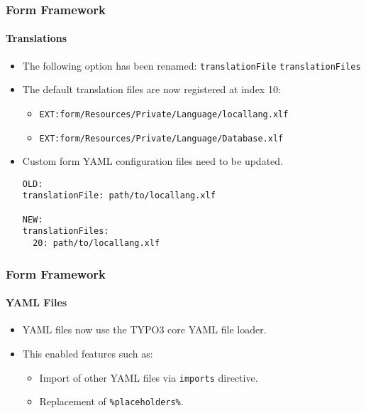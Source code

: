 \begin{frame}[fragile]
	\frametitle{Form Framework}
	\framesubtitle{Translations}

	\lstset{basicstyle=\tiny\ttfamily}

	\begin{itemize}
		\item The following option has been renamed:\newline
			\small\texttt{translationFile} \textrightarrow\hspace{0.1cm}\texttt{translationFiles}\normalsize
		\item The default translation files are now registered at index 10:

			\begin{itemize}
				\item \texttt{EXT:form/Resources/Private/Language/locallang.xlf}
				\item \texttt{EXT:form/Resources/Private/Language/Database.xlf}
			\end{itemize}

		\item Custom form YAML configuration files need to be updated.
\begin{lstlisting}
OLD:
translationFile: path/to/locallang.xlf

NEW:
translationFiles:
  20: path/to/locallang.xlf
\end{lstlisting}

	\end{itemize}

\end{frame}


\begin{frame}[fragile]
	\frametitle{Form Framework}
	\framesubtitle{YAML Files}

	\begin{itemize}
		\item YAML files now use the TYPO3 core YAML file loader.
		\item This enabled features such as:

			\begin{itemize}
				\item Import of other YAML files via \texttt{imports} directive.
				\item Replacement of \texttt{\%placeholders\%}.
			\end{itemize}

	\end{itemize}

\end{frame}

